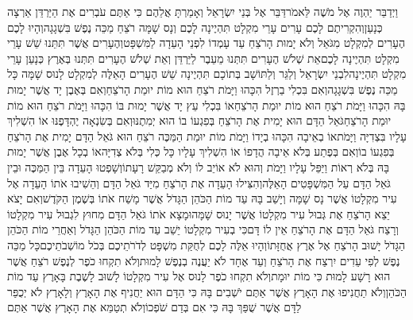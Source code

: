 \documentclass[../main/main.tex]{subfiles}
\begin{document}
\begin{multicols}{\ncols}
וַיְדַבֵּר יַהְוֶה אֶל מֹשֶׁה לֵּאמֹר\PreVerseSpace{}דַּבֵּר אֶל בְּנֵי יִשְׂרָאֵל וְאָמַרְתָּ אֲלֵהֶם כִּי אַתֶּם עֹבְרִים אֶת הַיַּרְדֵּן אַרְצָה כְּנָעַן\PreVerseSpace{}וְהִקְרִיתֶם לָכֶם עָרִים עָרֵי מִקְלָט תִּהְיֶינָה לָכֶם וְנָס שָׁמָּה רֹצֵחַ מַכֵּה נֶפֶשׁ בִּשְׁגָגָה\PreVerseSpace{}וְהָיוּ לָכֶם הֶעָרִים לְמִקְלָט מִגֹּאֵל וְלֹא יָמוּת הָרֹצֵחַ עַד עָמְדוֹ לִפְנֵי הָעֵדָה לַמִּשְׁפָּט\PreVerseSpace{}וְהֶעָרִים אֲשֶׁר תִּתֵּנוּ שֵׁשׁ עָרֵי מִקְלָט תִּהְיֶינָה לָכֶם\PreVerseSpace{}אֵת שְׁלֹשׁ הֶעָרִים תִּתְּנוּ מֵעֵבֶר לַיַּרְדֵּן וְאֵת שְׁלֹשׁ הֶעָרִים תִּתְּנוּ בְּאֶרֶץ כְּנָעַן עָרֵי מִקְלָט תִּהְיֶינָה\PreVerseSpace{}לִבְנֵי יִשְׂרָאֵל וְלַגֵּר וְלַתּוֹשָׁב בְּתוֹכָם תִּהְיֶינָה שֵׁשׁ הֶעָרִים הָאֵלֶּה לְמִקְלָט לָנוּס שָׁמָּה כָּל מַכֵּה נֶפֶשׁ בִּשְׁגָגָה\PreVerseSpace{}וְאִם בִּכְלִי בַרְזֶל הִכָּהוּ וַיָּמֹת רֹצֵחַ הוּא מוֹת יוּמַת הָרֹצֵחַ\PreVerseSpace{}וְאִם בְּאֶבֶן יָד אֲשֶׁר יָמוּת בָּהּ הִכָּהוּ וַיָּמֹת רֹצֵחַ הוּא מוֹת יוּמַת הָרֹצֵחַ\PreVerseSpace{}אוֹ בִּכְלִי עֵץ יָד אֲשֶׁר יָמוּת בּוֹ הִכָּהוּ וַיָּמֹת רֹצֵחַ הוּא מוֹת יוּמַת הָרֹצֵחַ\PreVerseSpace{}גֹּאֵל הַדָּם הוּא יָמִית אֶת הָרֹצֵחַ בְּפִגְעוֹ בוֹ הוּא יְמִתֶנּוּ\PreVerseSpace{}וְאִם בְּשִׂנְאָה יֶהְדָּפֶנּוּ אוֹ הִשְׁלִיךְ עָלָיו בִּצְדִיָּה וַיָּמֹת\PreVerseSpace{}אוֹ בְאֵיבָה הִכָּהוּ בְיָדוֹ וַיָּמֹת מוֹת יוּמַת הַמַּכֶּה רֹצֵחַ הוּא גֹּאֵל הַדָּם יָמִית אֶת הָרֹצֵחַ בְּפִגְעוֹ בוֹ\PreVerseSpace{}וְאִם בְּפֶתַע בְּלֹא אֵיבָה הֲדָפוֹ אוֹ הִשְׁלִיךְ עָלָיו כָּל כְּלִי בְּלֹא צְדִיָּה\PreVerseSpace{}אוֹ בְכָל אֶבֶן אֲשֶׁר יָמוּת בָּהּ בְּלֹא רְאוֹת וַיַּפֵּל עָלָיו וַיָּמֹת וְהוּא לֹא אוֹיֵב לוֹ וְלֹא מְבַקֵּשׁ רָעָתוֹ\PreVerseSpace{}וְשָׁפְטוּ הָעֵדָה בֵּין הַמַּכֶּה וּבֵין גֹּאֵל הַדָּם עַל הַמִּשְׁפָּטִים הָאֵלֶּה\PreVerseSpace{}וְהִצִּילוּ הָעֵדָה אֶת הָרֹצֵחַ מִיַּד גֹּאֵל הַדָּם וְהֵשִׁיבוּ אֹתוֹ הָעֵדָה אֶל עִיר מִקְלָטוֹ אֲשֶׁר נָס שָׁמָּה וְיָשַׁב בָּהּ עַד מוֹת הַכֹּהֵן הַגָּדֹל אֲשֶׁר מָשַׁח אֹתוֹ בְּשֶׁמֶן הַקֹּדֶשׁ\PreVerseSpace{}וְאִם יָצֹא יֵצֵא הָרֹצֵחַ אֶת גְּבוּל עִיר מִקְלָטוֹ אֲשֶׁר יָנוּס שָׁמָּה\PreVerseSpace{}וּמָצָא אֹתוֹ גֹּאֵל הַדָּם מִחוּץ לִגְבוּל עִיר מִקְלָטוֹ וְרָצַח גֹּאֵל הַדָּם אֶת הָרֹצֵחַ אֵין לוֹ דָּם\PreVerseSpace{}כִּי בְעִיר מִקְלָטוֹ יֵשֵׁב עַד מוֹת הַכֹּהֵן הַגָּדֹל וְאַחֲרֵי מוֹת הַכֹּהֵן הַגָּדֹל יָשׁוּב הָרֹצֵחַ אֶל אֶרֶץ אֲחֻזָּתוֹ\PreVerseSpace{}וְהָיוּ אֵלֶּה לָכֶם לְחֻקַּת מִשְׁפָּט לְדֹרֹתֵיכֶם בְּכֹל מוֹשְׁבֹתֵיכֶם\PreVerseSpace{}כָּל מַכֵּה נֶפֶשׁ לְפִי עֵדִים יִרְצַח אֶת הָרֹצֵחַ וְעֵד אֶחָד לֹא יַעֲנֶה בְנֶפֶשׁ לָמוּת\PreVerseSpace{}וְלֹא תִקְחוּ כֹפֶר לְנֶפֶשׁ רֹצֵחַ אֲשֶׁר הוּא רָשָׁע לָמוּת כִּי מוֹת יוּמָת\PreVerseSpace{}וְלֹא תִקְחוּ כֹפֶר לָנוּס אֶל עִיר מִקְלָטוֹ לָשׁוּב לָשֶׁבֶת בָּאָרֶץ עַד מוֹת הַכֹּהֵן\PreVerseSpace{}וְלֹא תַחֲנִיפוּ אֶת הָאָרֶץ אֲשֶׁר אַתֶּם יֹשְׁבִים\OmitEnd{} בָּהּ כִּי הַדָּם הוּא יַחֲנִיף אֶת הָאָרֶץ וְלָאָרֶץ לֹא יְכֻפַּר לַדָּם אֲשֶׁר שֻׁפַּךְ בָּהּ כִּי אִם בְּדַם שֹׁפְכוֹ\PreVerseSpace{}וְלֹא תְטַמֵּא אֶת הָאָרֶץ אֲשֶׁר אַתֶּם 
\end{multicols}
\end{document}
